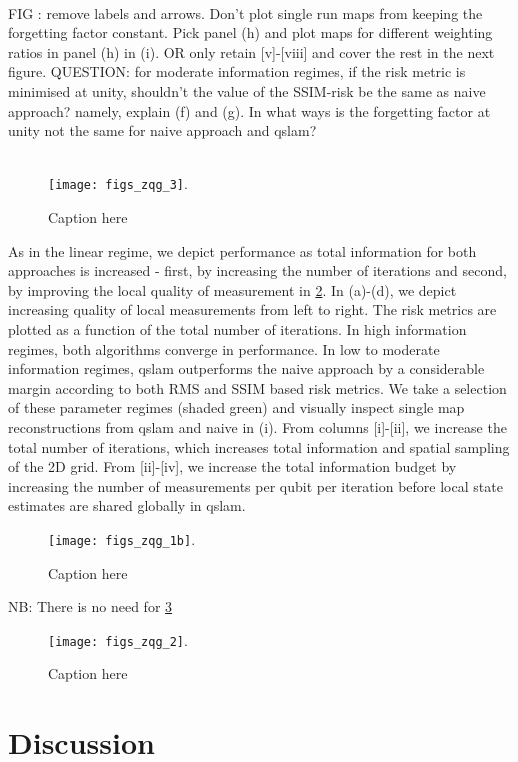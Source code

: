 \\
FIG : remove labels and arrows. Don't plot single run maps from keeping the forgetting factor constant. Pick panel (h) and plot maps for different weighting ratios in panel (h) in (i). OR only retain [v]-[viii] and cover the rest in the next figure. 
QUESTION: for moderate information regimes, if the risk metric is minimised at unity, shouldn't the value of the SSIM-risk be the same as naive approach? namely, explain (f) and (g). In what ways is the forgetting factor at unity not the same for naive approach and qslam? \\
\\
\begin{figure}
	\texttt{[image: figs\_zqg\_3]}. 
	\caption{\label{figs_zqg_3} Caption here}    	
\end{figure} 
As in the linear regime, we depict performance as total information for both approaches is increased - first, by increasing the number of iterations and second, by improving the local quality of measurement in \cref{figs_zqg_1b}. In (a)-(d), we depict increasing quality of local measurements from left to right. The risk metrics are plotted as a function of the total number of iterations. In high information regimes, both algorithms converge in performance. In low to moderate information regimes, qslam outperforms the naive approach by a considerable margin according to both RMS and SSIM based risk metrics. We take a selection of these parameter regimes (shaded green) and visually inspect single map reconstructions from qslam and naive in (i). From columns [i]-[ii], we increase the total number of iterations, which increases total information and spatial sampling of the 2D grid. From [ii]-[iv], we increase the total information budget by increasing the number of measurements per qubit per iteration before local state estimates are shared globally in qslam. 
\begin{figure}
	\texttt{[image: figs\_zqg\_1b]}. 
	\caption{\label{figs_zqg_1b} Caption here}    	
\end{figure}

\clearpage
NB: There is no need for \cref{figs_zqg_2}
\begin{figure}
	\texttt{[image: figs\_zqg\_2]}. 
	\caption{\label{figs_zqg_2} Caption here}    	
\end{figure}




\fi
\section{Discussion} \label{sec:discussion}

